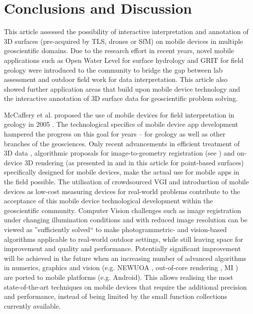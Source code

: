 \documentclass[review]{elsarticle}
\begin{document}
\section{Conclusions and Discussion}
\label{sec:conclusions}

This article assessed the possibility of interactive interpretation and annotation of 3D surfaces (pre-acquired by \gls{TLS}, drones or \gls{SfM}) on mobile devices in multiple geoscientific domains. Due to the research effort in recent years, novel mobile applications such as Open Water Level for surface hydrology and \gls{GRIT} for field geology were introduced to the community to bridge the gap between lab assessment and outdoor field work for data interpretation. This article also showed further application areas that build upon mobile device technology and the interactive annotation of 3D surface data for geoscientific problem solving.

McCaffery et al. proposed the use of mobile devices for field interpretation in geology in 2005 \cite{McCaffrey2005}. The technological specifics of mobile device app development hampered the progress on this goal for years -- for geology as well as other branches of the geosciences. Only recent advancements in efficient treatment of 3D data \cite{Kroehnert2017b}, algorithmic proposals for image-to-geometry registration (see \citep{Gauglitz2014,Kehl2017_VGC}) and on-device 3D rendering (as presented in \cite{Agus2017} and in this article for point-based surfaces) specifically designed for mobile devices, make the actual use for mobile apps in the field possible. The utilisation of crowdsourced \gls{VGI} and introduction of mobile devices as low-cost measuring devices for real-world problems \cite{Eltner2017} contribute to the acceptance of this mobile device technological development within the geoscientific community. Computer Vision challenges such as image registration under changing illumination conditions and with reduced image resolution can be viewed as ''sufficiently solved`` to make photogrammetric- and vision-based algorithms applicable to real-world outdoor settings, while still leaving space for improvement and quality and performance. Potentially significant improvement will be achieved in the future when an increasing number of advanced algorithms in numerics, graphics and vision (e.g. NEWUOA \cite{Powell2006}, out-of-core rendering \cite{Borgeat2005}, \gls{MI} \cite{Viola1997}) are ported to mobile platforms (e.g. Android). This allows realising the most state-of-the-art techniques on mobile devices that require the additional precision and performance, instead of being limited by the small function collections currently available.
\end{document}
